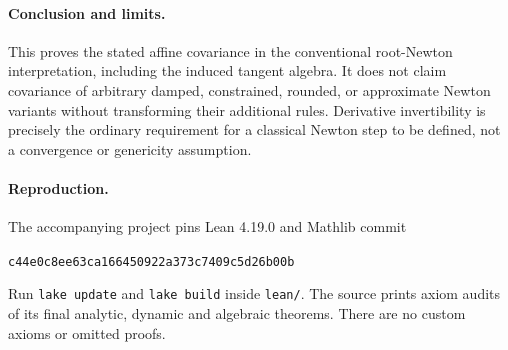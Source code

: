 \documentclass[11pt]{article}
\begin{document}
\paragraph{Conclusion and limits.}
This proves the stated affine covariance in the conventional root-Newton interpretation, including the induced tangent algebra. It does not claim covariance of arbitrary damped, constrained, rounded, or approximate Newton variants without transforming their additional rules. Derivative invertibility is precisely the ordinary requirement for a classical Newton step to be defined, not a convergence or genericity assumption.

\paragraph{Reproduction.}
The accompanying project pins Lean 4.19.0 and Mathlib commit
\begin{center}\small\texttt{c44e0c8ee63ca166450922a373c7409c5d26b00b}\end{center}
Run \texttt{lake update} and \texttt{lake build} inside \texttt{lean/}.
The source prints axiom audits of its final analytic, dynamic and algebraic theorems. There are no custom axioms or omitted proofs.
\end{document}

